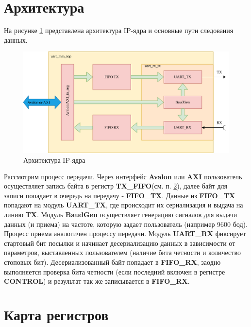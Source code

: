 \documentclass[a4paper,12pt]{article}
\begin{document}
\newpage
\section{Архитектура}

На рисунке \ref{img:design_ip} представлена архитектура IP-ядра и основные пути следования данных.

    \begin{figure}[H]
        \centering
        \includegraphics[width=15cm]{DesignIP.png}
        \caption{Архитектура IP-ядра}
        \label{img:design_ip}
    \end{figure}

Рассмотрим процесс передачи. Через интерфейс \textbf{Avalon} или \textbf{AXI} пользователь осуществляет запись байта в регистр \textbf{TX\_FIFO}(см. п. \ref{sec:register_map}), далее байт для записи попадает в очередь на передачу - \textbf{FIFO\_TX}. Данные из \textbf{FIFO\_TX} попадают на модуль \textbf{UART\_TX}, где происходит их сериализация и выдача на линию \textbf{TX}. Модуль \textbf{BaudGen} осуществляет генерацию сигналов для выдачи данных (и приема) на частоте, которую задает пользователь (например 9600 бод).
Процесс приема аналогичен процессу передачи. Модуль \textbf{UART\_RX} фиксирует стартовый бит посылки и начинает десериализацию данных в зависимости от параметров, выставленных пользователем (наличие бита четности и количество стоповых бит). Десериализованный байт попадает в \textbf{FIFO\_RX}, заодно выполняется проверка бита четности (если последний включен в регистре \textbf{CONTROL}) и результат так же записывается в \textbf{FIFO\_RX}.




\newpage
\section{Карта регистров}
\label{sec:register_map}
\end{document}
